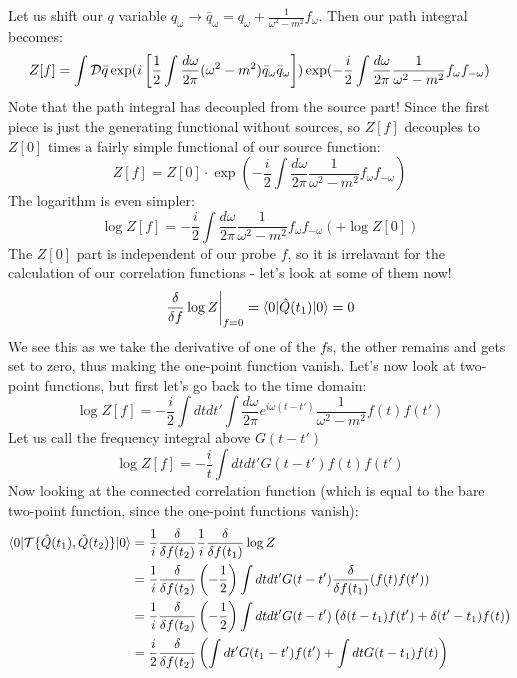 Let us shift our $q$ variable $q_\omega \to \bar{q}_\omega = q_\omega + \frac{1}{\omega^2 - m^2}f_\omega$. Then our path integral becomes:
\begin{equation}
    Z[f] = \int \mathcal{D} \bar{q}\exp(i\left[\frac{1}{2}\int \frac{d\omega}{2\pi}(\omega^2 - m^2)\bar{q}_\omega \bar{q}_{\omega}\right])\exp(-\frac{i}{2}\int \frac{d\omega}{2\pi}\frac{1}{\omega^2 - m^2}f_\omega f_{-\omega})
\end{equation}
Note that the path integral has decoupled from the source part! Since the first piece is just the generating functional without sources, so $Z[f]$ decouples to $Z[0]$ times a fairly simple functional of our source function:
\begin{equation}
    Z[f] = Z[0] \cdot  \exp(-\frac{i}{2}\int \frac{d\omega}{2\pi}\frac{1}{\omega^2 - m^2}f_\omega f_{-\omega})
\end{equation}
The logarithm is even simpler:
\begin{equation}
    \log Z[f] = -\frac{i}{2}\int \frac{d\omega}{2\pi}\frac{1}{\omega^2 - m^2}f_\omega f_{-\omega} \left(+ \log Z[0]\right)
\end{equation}
The $Z[0]$ part is independent of our probe $f$, so it is irrelavant for the calculation of our correlation functions - let's look at some of them now!
\begin{equation}
    \left.\frac{\delta }{\delta f}\log Z \right|_{f=0} = \langle 0 \rvert\hat{Q}(t_1)\lvert 0 \rangle = 0
\end{equation}
We see this as we take the derivative of one of the $f$s, the other remains and gets set to zero, thus making the one-point function vanish. Let's now look at two-point functions, but first let's go back to the time domain:
\begin{equation}
    \log Z[f] = -\frac{i}{2} \int dtdt'\int \frac{d\omega}{2\pi}e^{i\omega(t - t')}\frac{1}{\omega^2 - m^2}f(t)f(t')
\end{equation}
Let us call the frequency integral above $G(t - t')$
\begin{equation}
    \log Z[f] = -\frac{i}{t}\int dtdt' G(t - t')f(t)f(t')
\end{equation}
Now looking at the connected correlation function (which is equal to the bare two-point function, since the one-point functions vanish):
\begin{equation}
    \begin{split}
        \langle 0 \rvert\mathcal{T}\{\hat{Q}(t_1), \hat{Q}(t_2)\}\lvert 0 \rangle &= \frac{1}{i}\frac{\delta }{\delta f(t_2)}\frac{1}{i}\frac{\delta }{\delta f(t_1)}\log Z
        \\ &= \frac{1}{i}\frac{\delta }{\delta f(t_2)}\left(-\frac{1}{2}\right)\int dtdt' G(t-t')\frac{\delta }{\delta f(t_1)}(f(t)f(t'))
        \\ &= \frac{1}{i}\frac{\delta }{\delta f(t_2)}\left(-\frac{1}{2}\right)\int dtdt' G(t-t')\left(\delta(t - t_1)f(t') + \delta(t' - t_1)f(t)\right)
        \\ &= \frac{i}{2}\frac{\delta }{\delta f(t_2)}\left(\int dt' G(t_1 - t')f(t') + \int dt G(t - t_1)f(t)\right)
    \end{split}
\end{equation}
